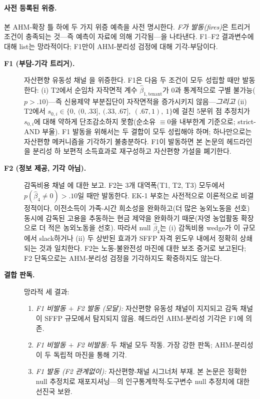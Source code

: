 \documentclass[12pt, a4paper]{article}
\begin{document}
\paragraph{사전 등록된 위증.} 본 AHM-확장 틀 하에 두 가지 위증 예측을 사전 명시한다. \emph{F가 발동(fires)}은 트리거 조건이 충족되는 것---즉 예측이 자료에 의해 기각됨---을 나타낸다. F1--F2 결과변수에 대해 list는 망라적이다; F1만이 AHM-분리성 검정에 대해 기각-부담이다.

\begin{description}
\item[\textbf{F1 (부담-기각 트리거).}] 자산편향 유동성 채널 \citep{CarterOlinto2003_liquidity}을 위증한다. F1은 다음 두 조건이 모두 성립할 때만 발동한다: (i) T2에서 순임차 자작면적 계수 $\hat\beta_{1,\text{tenant}}$가 0과 통계적으로 구별 불가능($p > .10$)---즉 신용제약 부분집단이 자작면적을 증가시키지 않음---\emph{그리고} (ii) T2에서 $s_{0,i} \in \{0,\ (0,.33],\ (.33,.67],\ (.67,1),\ 1\}$에 걸친 5분위 점 추정치가 $s_{0,i}$에 대해 약하게 단조감소하지 못함(순소유 $\equiv 0$을 내부한계 기준으로; strict-AND 부울). F1 발동을 위해서는 두 결합이 모두 성립해야 하며; 하나만으로는 자산편향 메커니즘을 기각하기 불충분하다. F1이 발동하면 본 논문의 헤드라인을 분리성 하 보편적 소득효과로 재구성하고 자산편향 가설을 폐기한다.

\item[\textbf{F2 (정보 제공, 기각 아님).}] 감독비용 채널 \citep{EswaranKotwal1986_supervision}에 대한 보고. F2는 3개 대역폭(T1, T2, T3) 모두에서 $p(\hat\beta_4 \ne 0) > .10$일 때만 발동한다. EK-1 부호는 사전적으로 이론적으로 비결정적이다, 이전소득이 가족-시간 희소성을 완화하고(더 많은 농외노동을 선호) 동시에 감독된 고용을 추동하는 현금 제약을 완화하기 때문(자영 농업활동 확장으로 더 적은 농외노동을 선호). 따라서 null $\hat\beta_4$는 (i) 감독비용 wedge가 이 규모에서 slack하거나 (ii) 두 상반된 효과가 SFFP 자격 윈도우 내에서 정확히 상쇄되는 것과 일치한다. F2는 노동-불완전성 마진에 대한 보조 증거로 보고된다; F2 단독으로는 AHM-분리성 검정을 기각하지도 확증하지도 않는다.

\item[\textbf{결합 판독.}] 망라적 세 결과:
\begin{enumerate}
\item \emph{F1 비발동 $+$ F2 발동 (모달):} 자산편향 유동성 채널이 지지되고 감독 채널이 SFFP 규모에서 탐지되지 않음. 헤드라인 AHM-분리성 기각은 F1에 의존.
\item \emph{F1 비발동 $+$ F2 비발동:} 두 채널 모두 작동. 가장 강한 판독; AHM-분리성이 두 독립적 마진을 통해 기각.
\item \emph{F1 발동 (F2 관계없이):} 자산편향-채널 시그너처 부재. 본 논문은 정확한 null 추정치로 재포지셔닝---\citet{LaFaveThomas2016_markets}의 인구통계학적-도구변수 null 추정치에 대한 선진국 보완.
\end{enumerate}
\end{description}
\end{document}
